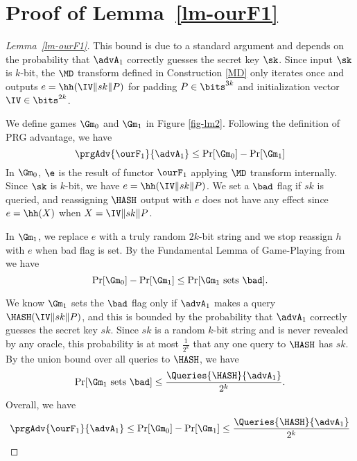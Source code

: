 \section{Proof of Lemma~\ref{lm-ourF1}} \label{sec-lem3}
\begin{proof}[Lemma~\ref{lm-ourF1}] 
	This bound is due to a standard argument and depends on the probability that $\advA_1$ correctly guesses the secret key $\sk$. Since input $\sk$ is $k$-bit, the $\MD$ transform defined in Construction \ref{MD} only iterates once and outputs $e = \hh(\IV\|sk\|P)$ for padding $P \in \bits^{3k}$ and initialization vector $\IV \in \bits^{2k}$. 
	
	We define games $\Gm_0$ and $\Gm_1$ in Figure \ref{fig-lm2}. 
	Following the definition of PRG advantage, we have 
	$$\prgAdv{\ourF_1}{\advA_1} \leq \Pr[\Gm_0] - \Pr[\Gm_1]$$
	In $\Gm_0$, $\e$ is the result of functor $\ourF_1$ applying $\MD$ transform internally. Since $\sk$ is $k$-bit, we have $e = \hh(\IV\|sk\|P)$. We set a $\bad$ flag if $sk$ is queried, and reassigning $\HASH$ output with $e$ does not have any effect since $e = \hh(X)$ when $X = \IV\|sk\|P$. 
	
	In $\Gm_1$, we replace $e$ with a truly random $2k$-bit string and we stop reassign $h$ with $e$ when bad flag is set. By the Fundamental Lemma of Game-Playing from~\cite{EC:BelRog06} we have
	$$ \Pr[\Gm_0] - \Pr[\Gm_1] \leq \Pr[\Gm_1 \text{ sets } \bad].$$
	
	We know $\Gm_1$ sets the $\bad$ flag only if $\advA_1$ makes a query $\HASH(\IV\|sk\|P)$, and this is bounded by the probability that $\advA_1$ correctly guesses the secret key $sk$. Since $sk$ is a random $k$-bit string and is never revealed by any oracle, this probability is at most $\frac{1}{2^k}$ that any one query to $\HASH$ has $sk$. By the union bound over all queries to $\HASH$, we have
	$$\Pr[\Gm_1 \text{ sets } \bad] \leq \frac{\Queries{\HASH}{\advA_1}}{2^k}.$$
	Overall, we have
	$$\prgAdv{\ourF_1}{\advA_1} \leq \Pr[\Gm_0] - \Pr[\Gm_1] \leq \frac{\Queries{\HASH}{\advA_1}}{2^k}$$
\end{proof}
